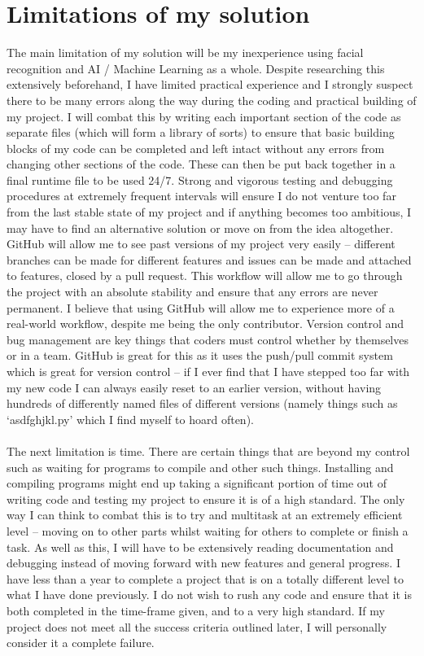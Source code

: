 \documentclass[9pt]{article}
\begin{document}
\newpage
\section{Limitations of my solution}\label{sec_limitations}
The main limitation of my solution will be my inexperience using facial recognition and AI / Machine Learning as a whole. Despite researching this extensively beforehand, I have limited practical experience and I strongly suspect there to be many errors along the way during the coding and practical building of my project. I will combat this by writing each important section of the code as separate files (which will form a library of sorts) to ensure that basic building blocks of my code can be completed and left intact without any errors from changing other sections of the code. These can then be put back together in a final runtime file to be used 24/7. Strong and vigorous testing and debugging procedures at extremely frequent intervals will ensure I do not venture too far from the last stable state of my project and if anything becomes too ambitious, I may have to find an alternative solution or move on from the idea altogether.
GitHub will allow me to see past versions of my project very easily – different branches can be made for different features and issues can be made and attached to features, closed by a pull request. This workflow will allow me to go through the project with an absolute stability and ensure that any errors are never permanent. I believe that using GitHub will allow me to experience more of a real-world workflow, despite me being the only contributor. Version control and bug management are key things that coders must control whether by themselves or in a team. GitHub is great for this as it uses the push/pull commit system which is great for version control – if I ever find that I have stepped too far with my new code I can always easily reset to an earlier version, without having hundreds of differently named files of different versions (namely things such as ‘asdfghjkl.py’ which I find myself to hoard often).\\\\
The next limitation is time. There are certain things that are beyond my control such as waiting for programs to compile and other such things. Installing and compiling programs might end up taking a significant portion of time out of writing code and testing my project to ensure it is of a high standard. The only way I can think to combat this is to try and multitask at an extremely efficient level – moving on to other parts whilst waiting for others to complete or finish a task. As well as this, I will have to be extensively reading documentation and debugging instead of moving forward with new features and general progress. I have less than a year to complete a project that is on a totally different level to what I have done previously. I do not wish to rush any code and ensure that it is both completed in the time-frame given, and to a very high standard. If my project does not meet all the success criteria outlined later, I will personally consider it a complete failure.\\\\
\end{document}
